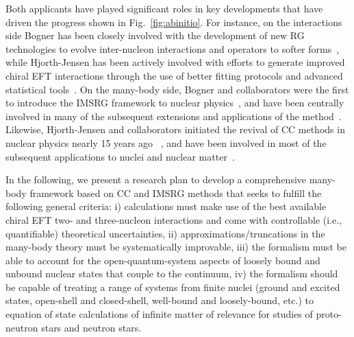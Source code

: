 Both applicants have played significant roles in key developments that
have driven the progress shown in Fig.~\ref{fig:abinitio}. For
instance, on the interactions side Bogner has been closely involved
with the development of new RG technologies to evolve inter-nucleon
interactions and operators to softer
forms~\cite{Bogner:2001gq,Bogner:2006vp,Bogner:2006pc,Bogner:2010pq},
while Hjorth-Jensen has been actively involved with efforts to
generate improved chiral EFT interactions through the use of better
fitting protocols and advanced statistical
tools~\cite{Ekstrom:2013kea,Ekstrom:2014dxa,Ekstrom:2015rta}.  On the
many-body side, Bogner and collaborators were the first to introduce
the IMSRG framework to nuclear
physics~\cite{Bogner:2010pq,Tsukiyama:2011uq,Tsukiyama:2012fk}, and
have been centrally involved in many of the subsequent extensions and
applications of the
method~\cite{Hergert:2014vn,Bogner:2014tg,Morris:2015ve,Stroberg:2015ymf,Hergert:2015awm}. Likewise,
Hjorth-Jensen and collaborators initiated the revival of CC methods in
nuclear physics nearly 15 years ago~\cite{Dean:2002bx,Dean:2003vc} ,
and have been involved in most of the subsequent applications to
nuclei and nuclear
matter~\cite{Hagen:2012sh,Hagen:2013nca,Jansen:2011gb,Jensen:2011mv,Hagen:2016xjv}.



In the following, we present a research plan to develop a
comprehensive many-body framework based on CC and IMSRG methods that
seeks to fulfill the following general criteria: i) calculations must
make use of the best available chiral EFT two- and three-nucleon
interactions and come with controllable (i.e., quantifiable)
theoretical uncertainties, ii) approximations/truncations in the
many-body theory must be systematically improvable, iii) the formalism
must be able to account for the open-quantum-system aspects of loosely
bound and unbound nuclear states that couple to the continuum, iv) the
formalism should be capable of treating a range of systems from finite
nuclei (ground and excited states, open-shell and closed-shell,
well-bound and loosely-bound, etc.) to equation of state calculations
of infinite matter of relevance for studies of proto-neutron stars and neutron stars.


